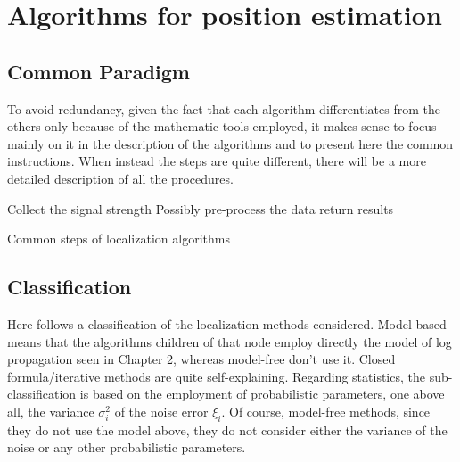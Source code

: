 \documentclass[12pt]{report}
\begin{document}
\clearpage

\chapter{Algorithms for position estimation}
\section{Common Paradigm}
To avoid redundancy, given the fact that each algorithm differentiates from the others only because of the mathematic tools employed, it makes sense to focus mainly on it in the description of the algorithms and to present here the common instructions.
When instead the steps are quite different, there will be a more detailed description of all the procedures.

\begin{algorithm}[H]
\SetAlgoLined
Collect the signal strength\;
Possibly pre-process the data\;
return results\;
 \caption{Common steps of localization algorithms}
\end{algorithm}

\section{Classification}
Here follows a classification of the localization methods considered. Model-based means that the algorithms children of that node employ directly the model of log propagation seen in Chapter 2, whereas model-free don't use it. Closed formula/iterative methods are quite self-explaining. Regarding statistics, the sub-classification is based on the employment of probabilistic parameters, one above all, the variance $\sigma^2_i$ of the noise error $\xi_i$. Of course, model-free methods, since they do not use the model above, they do not consider either the variance of the noise or any other probabilistic parameters.

\begin{figure}
\end{figure}
\end{document}
